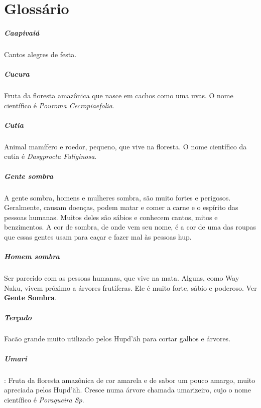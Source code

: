 \chapter{Glossário}


\paragraph{Caapivaiá} Cantos alegres de festa.

\paragraph{Cucura} Fruta da floresta amazônica que nasce em cachos
como uma uvas. O nome científico é \textit{Pouroma Cecropiaefolia}.

\paragraph{Cutia} Animal mamífero e roedor, pequeno, que vive na floresta. O nome
científico da cutia é \textit{Dasyprocta Fuliginosa}.

\paragraph{Gente sombra} A gente­ sombra, homens e mulheres­ sombra, são
muito fortes e perigosos. Geralmente, causam doenças, podem matar
e comer a carne e o espírito das pessoas humanas. Muitos deles
são sábios e conhecem cantos, mitos e benzimentos. A cor de
sombra, de onde vem seu nome, é a cor de uma das roupas que essas gentes
usam para caçar e fazer mal às pessoas hup.

\paragraph{Homem sombra} Ser parecido com as pessoas
humanas, que vive na mata. Alguns, como Way Naku, vivem próximo a árvores frutíferas. Ele
é muito forte, sábio e poderoso. Ver \textbf{Gente­ Sombra}.

\paragraph{Terçado} Facão grande muito utilizado pelos Hupd’äh para cortar
galhos e árvores.

\paragraph{Umari}: Fruta da floresta amazônica de cor
amarela e de sabor um pouco amargo, muito apreciada pelos Hupd’äh.
Cresce numa árvore chamada umarizeiro, cujo o nome científico é \textit{Poraqueira Sp}.
